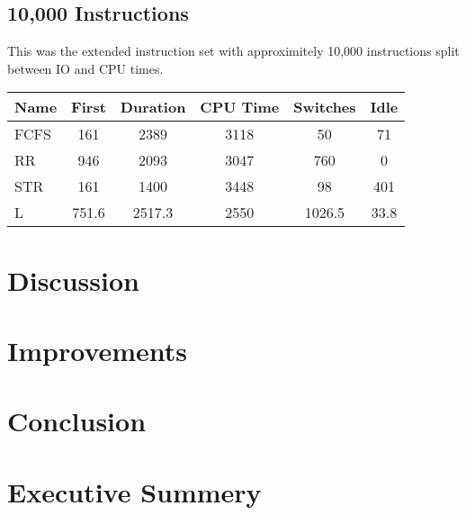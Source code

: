 \documentclass{acm_proc_article-sp}
\begin{document}
\subsection{10,000 Instructions}

This was the extended instruction set with approximitely 10,000 instructions split between IO and CPU times.

\begin{tabular}{| l | c | c | c | c | c |}
  \hline
  Name & First & Duration & CPU Time & Switches &  Idle \\
  \hline
  FCFS & 161 & 2389 & 3118 & 50 & 71 \\
  RR & 946 & 2093 & 3047 & 760 & 0 \\
  STR & 161 & 1400 & 3448 & 98 & 401\\
  L & 751.6 & 2517.3 & 2550 & 1026.5 & 33.8 \\ 
  \hline
\end{tabular}

\section{Discussion}

\section{Improvements}


\section{Conclusion}

\section{Executive Summery}
\end{document}
